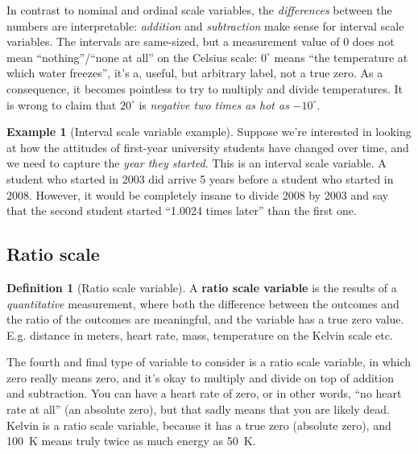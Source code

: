 \documentclass[
  11pt,
]{book}
\theoremstyle{definition}
\newtheorem{definition}{Definition}[chapter]
\theoremstyle{definition}
\newtheorem{example}{Example}[chapter]
\theoremstyle{definition}
\theoremstyle{definition}
\theoremstyle{remark}
\begin{document}
In contrast to nominal and ordinal scale variables, the \emph{differences} between the numbers are interpretable: \emph{addition} and \emph{subtraction} make sense for interval scale variables. The intervals are same-sized, but a measurement value of 0 does not mean ``nothing''/``none at all'' on the Celsius scale: \(0^\circ\) means ``the temperature at which water freezes'', it's a, useful, but arbitrary label, not a true zero. As a consequence, it becomes pointless to try to multiply and divide temperatures. It is wrong to claim that \(20^\circ\) is \emph{negative two times as hot as} \(-10^\circ\).

\begin{example}[Interval scale variable example]
\protect\hypertarget{exm:exinterval}{}\label{exm:exinterval}Suppose we're interested in looking at how the attitudes of first-year university students have changed over time, and we need to capture the \emph{year they started}. This is an interval scale variable. A student who started in 2003 did arrive 5 years before a student who started in 2008. However, it would be completely insane to divide 2008 by 2003 and say that the second student started ``1.0024 times later'' than the first one.
\end{example}

\hypertarget{ratioscale}{%
\subsection{Ratio scale}\label{ratioscale}}

\begin{definition}[Ratio scale variable]
\protect\hypertarget{def:defratio}{}\label{def:defratio}A \textbf{ratio scale variable} is the results of a \emph{quantitative} measurement, where both the difference between the outcomes and the ratio of the outcomes are meaningful, and the variable has a true zero value. E.g. distance in meters, heart rate, mass, temperature on the Kelvin scale etc.
\end{definition}

The fourth and final type of variable to consider is a ratio scale variable, in which zero really means zero, and it's okay to multiply and divide on top of addition and subtraction. You can have a heart rate of zero, or in other words, ``no heart rate at all'' (an absolute zero), but that sadly means that you are likely dead. Kelvin is a ratio scale variable, because it has a true zero (absolute zero), and 100~K means truly twice as much energy as 50~K.
\end{document}
